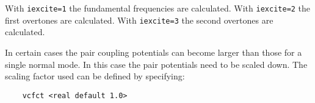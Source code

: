 With \verb+iexcite=1+ the fundamental frequencies are calculated.
With \verb+iexcite=2+ the first overtones are calculated.
With \verb+iexcite=3+ the second overtones are calculated.

In certain cases the pair coupling potentials can become larger than those for a single 
normal mode. In this case the pair potentials need to be scaled down. The scaling factor 
used can be defined by specifying:

\begin{verbatim}
    vcfct <real default 1.0>
\end{verbatim}


